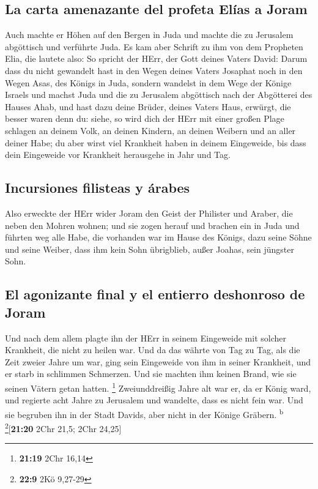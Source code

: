\hypertarget{la-carta-amenazante-del-profeta-eluxedas-a-joram}{%
\subsection{La carta amenazante del profeta Elías a
Joram}\label{la-carta-amenazante-del-profeta-eluxedas-a-joram}}

 Auch machte er Höhen auf den Bergen in Juda und machte
die zu Jerusalem abgöttisch und verführte Juda.  Es kam
aber Schrift zu ihm von dem Propheten Elia, die lautete also: So spricht
der HErr, der Gott deines Vaters David: Darum dass du nicht gewandelt
hast in den Wegen deines Vaters Josaphat noch in den Wegen Asas, des
Königs in Juda,  sondern wandelst in dem Wege der Könige
Israels und machst Juda und die zu Jerusalem abgöttisch nach der
Abgötterei des Hauses Ahab, und hast dazu deine Brüder, deines Vaters
Haus, erwürgt, die besser waren denn du:  siehe, so wird
dich der HErr mit einer großen Plage schlagen an deinem Volk, an deinen
Kindern, an deinen Weibern und an aller deiner Habe;  du
aber wirst viel Krankheit haben in deinem Eingeweide, bis dass dein
Eingeweide vor Krankheit herausgehe in Jahr und Tag.

\hypertarget{incursiones-filisteas-y-uxe1rabes}{%
\subsection{Incursiones filisteas y
árabes}\label{incursiones-filisteas-y-uxe1rabes}}

 Also erweckte der HErr wider Joram den Geist der
Philister und Araber, die neben den Mohren wohnen;  und
sie zogen herauf und brachen ein in Juda und führten weg alle Habe, die
vorhanden war im Hause des Königs, dazu seine Söhne und seine Weiber,
dass ihm kein Sohn übrigblieb, außer Joahas, sein jüngster Sohn.

\hypertarget{el-agonizante-final-y-el-entierro-deshonroso-de-joram}{%
\subsection{El agonizante final y el entierro deshonroso de
Joram}\label{el-agonizante-final-y-el-entierro-deshonroso-de-joram}}

 Und nach dem allem plagte ihn der HErr in seinem
Eingeweide mit solcher Krankheit, die nicht zu heilen war.
 Und da das währte von Tag zu Tag, als die Zeit zweier
Jahre um war, ging sein Eingeweide von ihm in seiner Krankheit, und er
starb in schlimmen Schmerzen. Und sie machten ihm keinen Brand, wie sie
seinen Vätern getan hatten. \footnote{\textbf{21:19} 2Chr 16,14}
 Zweiunddreißig Jahre alt war er, da er König ward, und
regierte acht Jahre zu Jerusalem und wandelte, dass es nicht fein war.
Und sie begruben ihn in der Stadt Davids, aber nicht in der Könige
Gräbern. \textsuperscript{b} \footnote{\textbf{22:9} 2Kö 9,27-29}{[}\textbf{21:20}
2Chr 21,5; 2Chr 24,25{]}

